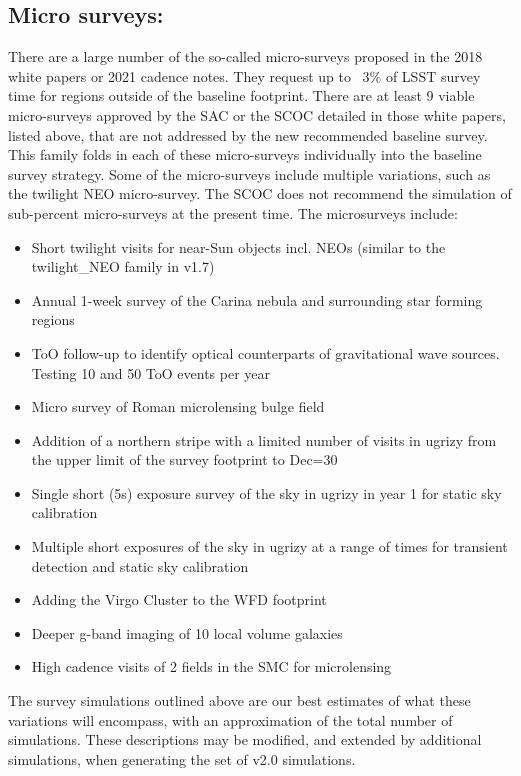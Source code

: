 \subsection{Micro surveys: }
There are a large number of the so-called micro-surveys proposed in the 2018 white papers or 2021 cadence notes. They request up to ~3\% of LSST survey time for regions outside of the baseline footprint. There are at least 9 viable micro-surveys approved by the SAC or the SCOC detailed in those white papers, listed above, that are not addressed by the new recommended baseline survey. This family folds in each of these micro-surveys individually into the baseline survey strategy.  Some of the micro-surveys include multiple variations, such as the twilight NEO micro-survey. The SCOC does not recommend the simulation of sub-percent micro-surveys at the present time. The microsurveys include:
\begin{itemize}
\item Short twilight visits for near-Sun objects incl. NEOs (similar to the twilight\_NEO family in v1.7)
\item Annual 1-week survey of the Carina nebula and surrounding star forming regions
\item ToO follow-up to identify optical counterparts of gravitational wave sources. Testing 10 and 50 ToO events per year
\item Micro survey of Roman microlensing bulge field
\item Addition of a northern stripe with a limited number of visits in ugrizy from the upper limit of the survey footprint to Dec=30
\item Single short (5s) exposure survey of the sky in ugrizy in year 1 for static sky calibration %
\item Multiple short exposures of the sky in ugrizy at a range of times for transient detection and static sky calibration %
\item Adding the Virgo Cluster to the WFD footprint
\item Deeper g-band imaging of 10 local volume galaxies
\item High cadence visits of 2 fields in the SMC for microlensing
\end{itemize}

The survey simulations outlined above are our best estimates of what these variations will encompass, with an approximation of the total number of simulations. These descriptions may be modified, and extended by additional simulations, when generating the set of v2.0 simulations. 
 

